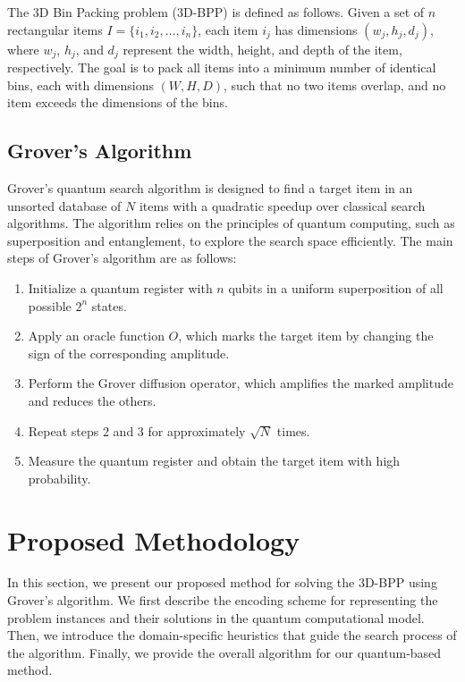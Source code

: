 The 3D Bin Packing problem (3D-BPP) is defined as follows. Given a set of $n$ rectangular items $I = \{i_1, i_2, \dots, i_n\}$, each item $i_j$ has dimensions $(w_j, h_j, d_j)$, where $w_j$, $h_j$, and $d_j$ represent the width, height, and depth of the item, respectively. The goal is to pack all items into a minimum number of identical bins, each with dimensions $(W, H, D)$, such that no two items overlap, and no item exceeds the dimensions of the bins.

\subsection{Grover's Algorithm} 

Grover's quantum search algorithm \cite{2} is designed to find a target item in an unsorted database of $N$ items with a quadratic speedup over classical search algorithms. The algorithm relies on the principles of quantum computing, such as superposition and entanglement, to explore the search space efficiently. The main steps of Grover's algorithm are as follows:

\begin{enumerate}
    \item Initialize a quantum register with $n$ qubits in a uniform superposition of all possible $2^n$ states.
    
    \item Apply an oracle function $O$, which marks the target item by changing the sign of the corresponding amplitude.
    
    \item Perform the Grover diffusion operator, which amplifies the marked amplitude and reduces the others.
    
    \item Repeat steps 2 and 3 for approximately $\sqrt{N}$ times.
    
    \item Measure the quantum register and obtain the target item with high probability.
\end{enumerate}

\section{Proposed Methodology} \label{sec:methodology}

In this section, we present our proposed method for solving the 3D-BPP using Grover's algorithm. We first describe the encoding scheme for representing the problem instances and their solutions in the quantum computational model. Then, we introduce the domain-specific heuristics that guide the search process of the algorithm. Finally, we provide the overall algorithm for our quantum-based method.

